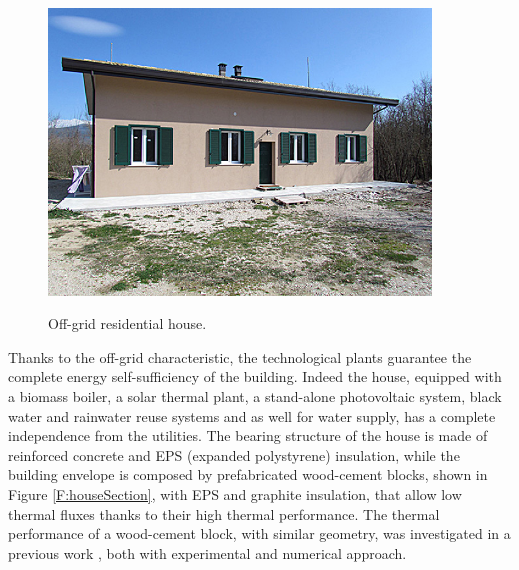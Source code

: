 \begin{figure}[h!]
	\begin{center}
		\includegraphics[width=24pc]{figures/Vista_sud.eps}
		\caption{Off-grid residential house.}
		\captionsetup{justification=centering}
		\label{F:house}
	\end{center}
\end{figure}

Thanks to the off-grid characteristic, the technological plants guarantee the complete energy self-sufficiency of the building. Indeed the house, equipped with a biomass boiler, a solar thermal plant, a stand-alone photovoltaic system, black water and rainwater reuse systems and as well for water supply, has a complete independence from the utilities.   
The bearing structure of the house is made of reinforced concrete and EPS (expanded polystyrene) insulation, while the building envelope is composed by prefabricated wood-cement blocks, shown in Figure \ref{F:houseSection}, with EPS and graphite insulation, that allow low thermal fluxes thanks to their high thermal performance. The thermal performance of a wood-cement block, with similar geometry, was investigated in a previous work \cite{Nardi2016}, both with experimental and numerical approach.

